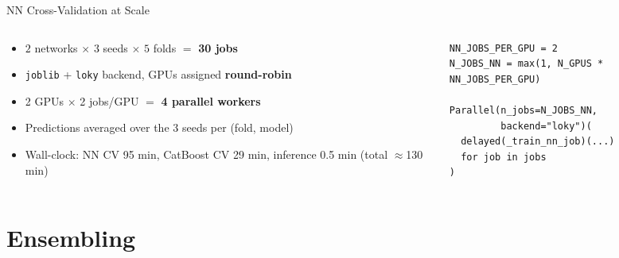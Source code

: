 \documentclass[9pt,aspectratio=169]{beamer}
\begin{document}
\begin{frame}[fragile]{NN Cross-Validation at Scale}
  \begin{columns}[T]
    \begin{column}{0.55\textwidth}
      \begin{itemize}
        \item $2$ networks $\times$ $3$ seeds $\times$ $5$ folds $=$ \textbf{30 jobs}
        \item \texttt{joblib} + \texttt{loky} backend, GPUs assigned \textbf{round-robin}
        \item 2 GPUs $\times$ 2 jobs/GPU $=$ \textbf{4 parallel workers}
        \item Predictions averaged over the 3 seeds per (fold, model)
        \item Wall-clock: NN CV 95 min, CatBoost CV 29 min, inference 0.5 min (total $\approx$130 min)
      \end{itemize}
    \end{column}
    \begin{column}{0.45\textwidth}
      \begin{lstlisting}
NN_JOBS_PER_GPU = 2
N_JOBS_NN = max(1, N_GPUS * NN_JOBS_PER_GPU)

Parallel(n_jobs=N_JOBS_NN,
         backend="loky")(
  delayed(_train_nn_job)(...)
  for job in jobs
)
      \end{lstlisting}
    \end{column}
  \end{columns}
\end{frame}

\section{Ensembling}
\end{document}
